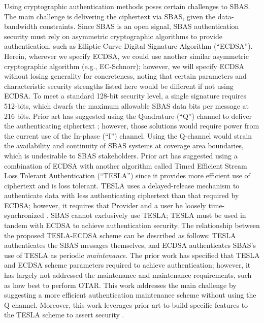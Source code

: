 \documentclass[letterpaper,times]{IONconf/IONconf}
\begin{document}
Using cryptographic authentication methods poses certain challenges to SBAS.
The main challenge is delivering the ciphertext via SBAS, given the data-bandwidth constraints.
Since SBAS is an open signal, SBAS authentication security must rely on asymmetric cryptographic algorithms to provide authentication, such as Elliptic Curve Digital Signature Algorithm (``ECDSA'').
Herein, wherever we specify ECDSA, we could use another similar asymmetric cryptographic algorithm (e.g., EC-Schnorr); however, we will specify ECDSA without losing generality for concreteness, noting that certain parameters and characteristic security strengths listed here would be different if not using ECDSA.
To meet a standard 128-bit security level, a single signature requires 512-bits, which dwarfs the maximum allowable SBAS data bits per message at 216 bits.
Prior art has suggested using the Quadrature (``Q'') channel to deliver the authenticating ciphertext \cite{todd-pki-scheme,other_schemes}; however, those solutions would require power from the current use of the In-phase (``I'') channel.
Using the Q-channel would strain the availability and continuity of SBAS systems at coverage area boundaries, which is undesirable to SBAS stakeholders.
Prior art has suggested using a combination of ECDSA with another algorithm called Timed Efficient Stream Loss Tolerant Authentication (``TESLA'') \cite{Neish_Dissertation, gal-os-tesla} since it provides more efficient use of ciphertext and is loss tolerant.
TESLA uses a delayed-release mechanism to authenticate data with less authenticating ciphertext than that required by ECDSA; however, it requires that Provider and a user be loosely time-synchronized \cite{perrig2005timed}.
SBAS cannot exclusively use TESLA; TESLA must be used in tandem with ECDSA to achieve authentication security.
The relationship between the proposed TESLA-ECDSA scheme can be described as follows: TESLA authenticates the SBAS messages themselves, and ECDSA authenticates SBAS's use of TESLA as periodic {\em maintenance}.
The prior work has specified that TESLA and ECDSA scheme parameters required to achieve authentication; however, it has largely not addressed the maintenance and maintenance requirements, such as how best to perform OTAR.
This work addresses the main challenge by suggesting a more efficient authentication maintenance scheme without using the Q channel.
Moreover, this work leverages prior art to build specific features to the TESLA scheme to assert security \cite{chain-security}.
\end{document}
